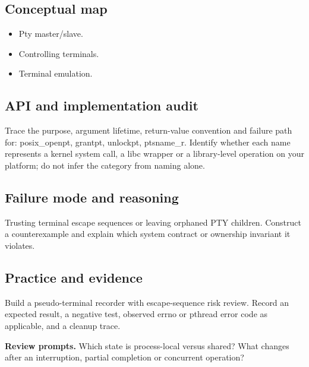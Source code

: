 \documentclass[11pt,letterpaper,oneside]{report}
\begin{document}
\subsection{Conceptual map}
\begin{itemize}
\item Pty master/slave.
\item Controlling terminals.
\item Terminal emulation.
\end{itemize}
\subsection{API and implementation audit}
Trace the purpose, argument lifetime, return-value convention and failure path for: posix\_openpt, grantpt, unlockpt, ptsname\_r. Identify whether each name represents a kernel system call, a libc wrapper or a library-level operation on your platform; do not infer the category from naming alone.

\subsection{Failure mode and reasoning}
Trusting terminal escape sequences or leaving orphaned PTY children. Construct a counterexample and explain which system contract or ownership invariant it violates.

\subsection{Practice and evidence}
Build a pseudo-terminal recorder with escape-sequence risk review. Record an expected result, a negative test, observed errno or pthread error code as applicable, and a cleanup trace.

\textbf{Review prompts.} Which state is process-local versus shared? What changes after an interruption, partial completion or concurrent operation?
\end{document}
